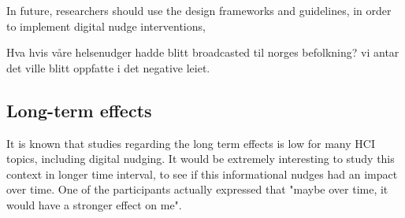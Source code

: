 In future, researchers should use the design frameworks and guidelines, in order to implement digital nudge interventions, 

Hva hvis våre helsenudger hadde blitt broadcasted til norges befolkning? vi antar det ville blitt oppfatte i det negative leiet. 

\subsection{Long-term effects}
It is known that studies regarding the long term effects is low for many HCI topics, including digital nudging. It would be extremely interesting to study this context in longer time interval, to see if this informational nudges had an impact over time. One of the participants actually expressed that "maybe over time, it would have a stronger effect on me". 